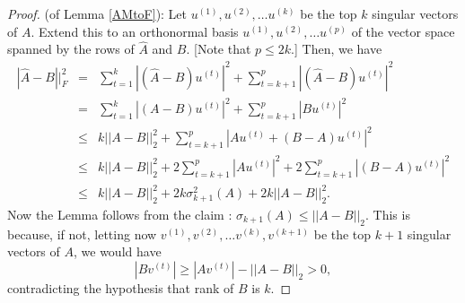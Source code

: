 \documentclass{book}
\numberwithin{exercise}{chapter}
\begin{document}
\begin{proof} (of Lemma \ref{AMtoF}):
Let $u^{(1)},u^{(2)},\ldots u^{(k)}$ be the top $k$ singular vectors of $A$. Extend this to an
orthonormal basis $u^{(1)},u^{(2)},\ldots u^{(p)}$ of the vector space spanned by the rows of
$\hat A$ and $B$. [Note that $p\leq 2k$.] Then, we have
\begin{eqnarray*}
|\hat A-B||_F^2&=&\sum_{t=1}^k|(\hat A-B)u^{(t)}|^2+\sum_{t=k+1}^p|(\hat A-B)u^{(t)}|^2\\
&=& \sum_{t=1}^k |(A-B)u^{(t)}|^2+\sum_{t=k+1}^p |Bu^{(t)}|^2\\
&\leq& k||A-B||_2^2+\sum_{t=k+1}^p |Au^{(t)}+(B-A)u^{(t)}|^2\\
&\leq& k||A-B||_2^2+2\sum_{t=k+1}^p |Au^{(t)}|^2+2\sum_{t=k+1}^p |(B-A)u^{(t)}|^2\\
&\leq& k||A-B||_2^2+2k\sigma_{k+1}^2(A)+2k||A-B||_2^2.
\end{eqnarray*}
Now the Lemma follows from the claim : $\sigma_{k+1}(A)\leq ||A-B||_2$. This is because,
if not, letting now  $v^{(1)},v^{(2)},\ldots v^{(k)},v^{(k+1)}$ be the top $k+1$ singular vectors
of $A$, we would have
$$|Bv^{(t)}|\geq |Av^{(t)}|-||A-B||_2>0,$$ contradicting the hypothesis that rank of $B$ is $k$.
\end{proof}
\end{document}
